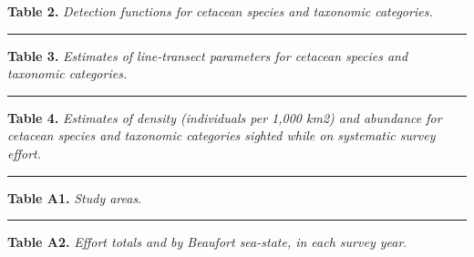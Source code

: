 \documentclass[
]{book}
\newenvironment{Shaded}{\begin{snugshade}}{\end{snugshade}}
\newcommand{\NormalTok}[1]{#1}
\newcommand{\OperatorTok}[1]{\textcolor[rgb]{0.81,0.36,0.00}{\textbf{#1}}}
\begin{document}
\textbf{Table 2.} \emph{Detection functions for cetacean species and taxonomic categories.}

\begin{Shaded}
\end{Shaded}

\begin{center}\rule{0.5\linewidth}{0.5pt}\end{center}

\textbf{Table 3.} \emph{Estimates of line-transect parameters for cetacean species and taxonomic categories.}

\begin{Shaded}
\end{Shaded}

\begin{center}\rule{0.5\linewidth}{0.5pt}\end{center}

\textbf{Table 4.} \emph{Estimates of density (individuals per 1,000 km2) and abundance for cetacean species and taxonomic categories sighted while on systematic survey effort.}

\begin{Shaded}
\end{Shaded}

\begin{center}\rule{0.5\linewidth}{0.5pt}\end{center}

\textbf{Table A1.} \emph{Study areas}.

\begin{Shaded}
\end{Shaded}

\begin{center}\rule{0.5\linewidth}{0.5pt}\end{center}

\textbf{Table A2.} \emph{Effort totals and by Beaufort sea-state, in each survey year}.
\end{document}
